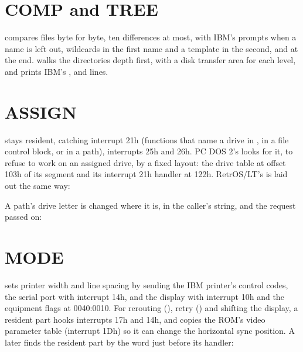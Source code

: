 \section{COMP and TREE}

 compares files byte for byte, ten differences at most, with
IBM's prompts when a name is left out, wildcards in the first name and a
template in the second, and  at the end.
 walks the directories depth first, with a disk transfer area
for each level, and prints IBM's , 
and  lines.

\section{ASSIGN}

 stays resident, catching interrupt 21h (functions that
name a drive in , in a file control block, or in a path),
interrupts 25h and 26h. PC DOS 2's  looks for it, to refuse
to work on an assigned drive, by a fixed layout: the drive table at offset
103h of its segment and its interrupt 21h handler at 122h. RetrOS/LT's
 is laid out the same way:


A path's drive letter is changed where it is, in the caller's string, and
the request passed on:



\section{MODE}

 sets printer width and line spacing by sending the IBM
printer's control codes, the serial port with interrupt 14h, and the
display with interrupt 10h and the equipment flags at 0040:0010. For
rerouting (), retry () and shifting the
display, a resident part hooks interrupts 17h and 14h, and copies the
ROM's video parameter table (interrupt 1Dh) so it can change the
horizontal sync position. A later  finds the resident part by
the word  just before its handler:

